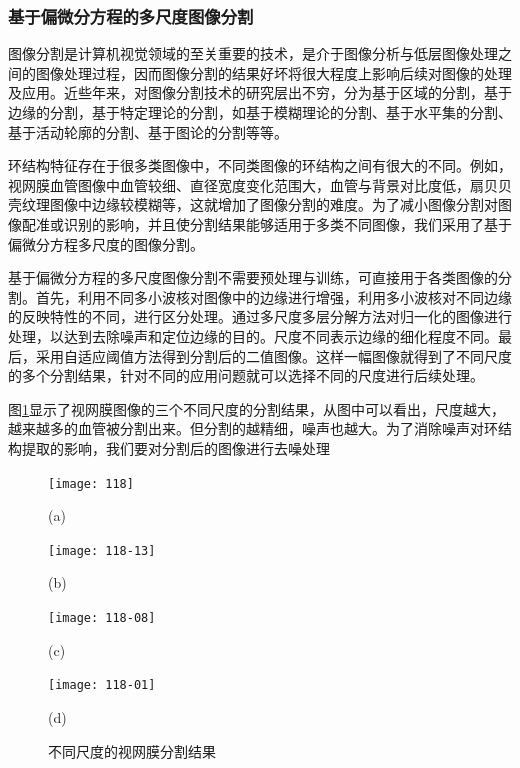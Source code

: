 \subsubsection{基于偏微分方程的多尺度图像分割}

图像分割是计算机视觉领域的至关重要的技术，是介于图像分析与低层图像处理之间的图像处理过程，因而图像分割的结果好坏将很大程度上影响后续对图像的处理及应用。近些年来，对图像分割技术的研究层出不穷，分为基于区域的分割，基于边缘的分割，基于特定理论的分割，如基于模糊理论的分割、基于水平集的分割、基于活动轮廓的分割、基于图论的分割\cite{xuxiaoli}等等。

环结构特征存在于很多类图像中，不同类图像的环结构之间有很大的不同。例如，视网膜血管图像中血管较细、直径宽度变化范围大，血管与背景对比度低，扇贝贝壳纹理图像中边缘较模糊等，这就增加了图像分割的难度。为了减小图像分割对图像配准或识别的影响，并且使分割结果能够适用于多类不同图像，我们采用了基于偏微分方程多尺度的图像分割。

基于偏微分方程的多尺度图像分割\cite{wang2013retinal}不需要预处理与训练，可直接用于各类图像的分割。首先，利用不同多小波核对图像中的边缘进行增强，利用多小波核对不同边缘的反映特性的不同，进行区分处理。通过多尺度多层分解方法对归一化的图像进行处理，以达到去除噪声和定位边缘的目的。尺度不同表示边缘的细化程度不同。最后，采用自适应阈值方法得到分割后的二值图像。这样一幅图像就得到了不同尺度的多个分割结果，针对不同的应用问题就可以选择不同的尺度进行后续处理。

图\ref{fig:Segmentaion-retinal}显示了视网膜图像的三个不同尺度的分割结果，从图中可以看出，尺度越大，越来越多的血管被分割出来。但分割的越精细，噪声也越大。为了消除噪声对环结构提取的影响，我们要对分割后的图像进行去噪处理

\begin{figure}
\centering
  \begin{minipage}[b]{0.48\textwidth} 
      \centering 
      \texttt{[image: 118]}
        \centerline{(a)}\medskip
    \end{minipage}
  \begin{minipage}[b]{0.48\textwidth}
    \centering
    \texttt{[image: 118-13]}
      \centerline{(b)}\medskip
  \end{minipage}
  \begin{minipage}[b]{0.48\textwidth}
    \centering
    \texttt{[image: 118-08]}
      \centerline{(c)}\medskip
  \end{minipage}
  \begin{minipage}[b]{0.48\textwidth}
    \centering
    \texttt{[image: 118-01]}
      \centerline{(d)}\medskip
	\label{fig:max}
  \end{minipage}
\caption{不同尺度的视网膜分割结果}
\label{fig:Segmentaion-retinal}
\end{figure}
